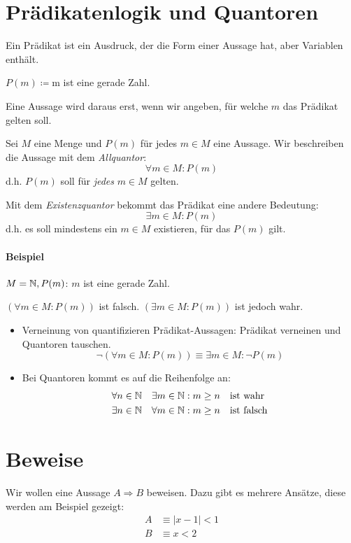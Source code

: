 \section{Prädikatenlogik und Quantoren}
Ein Prädikat ist ein Ausdruck, der die Form einer Aussage hat, aber Variablen enthält.

$P(m)\coloneqq$\glqq m ist eine gerade Zahl. \grqq

\noindent
Eine Aussage wird daraus erst, wenn wir angeben, für welche $m$ das Prädikat gelten soll.

Sei $M$ eine Menge und $P(m)$ für jedes $m\in M$ eine Aussage. Wir beschreiben die Aussage mit dem \emph{Allquantor}:
\begin{equation*}
  \forall m\in M: P(m)
\end{equation*}
d.h. $P(m)$ soll für \emph{jedes} $m\in M$ gelten.

Mit dem \emph{Existenzquantor} bekommt das Prädikat eine andere Bedeutung:
\begin{equation*}
  \exists m\in M: P(m)
\end{equation*}
d.h. es soll mindestens ein $m\in M$ existieren, für das $P(m)$ gilt.

\paragraph{Beispiel}
$M=\mathbb{N}, P(m)$: \glqq $m$ ist eine gerade Zahl.\grqq

$(\forall m\in M: P(m))$ ist falsch. $(\exists m\in M: P(m))$ ist jedoch wahr.

\bemerkung
\begin{itemize}
  \item Verneinung von quantifizieren Prädikat-Aussagen:
  \glqq Prädikat verneinen und Quantoren tauschen.\grqq
  \begin{equation*}
    \neg(\forall m\in M: P(m)) \equiv  \exists m\in M: \neg P(m)
  \end{equation*}
  \item Bei Quantoren kommt es auf die Reihenfolge an:
  \begin{align*}
    \forall n\in\mathbb{N} \quad\exists m\in \mathbb{N} &: m\geq n \quad\text{ist wahr}\\
    \exists n\in\mathbb{N} \quad\forall m\in \mathbb{N} &: m\geq n \quad\text{ist falsch}\\
  \end{align*}
\end{itemize}


\section{Beweise}
Wir wollen eine Aussage $A\Rightarrow B$ beweisen. Dazu gibt es mehrere Ansätze, diese werden am Beispiel gezeigt:
\begin{align*}
  A &\equiv |x-1|<1\\
  B &\equiv x<2
\end{align*}
